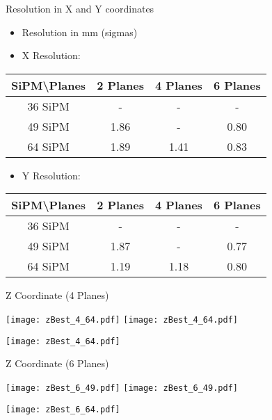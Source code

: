 \documentclass{beamer}
\begin{document}
\begin{frame}{Resolution in X and Y coordinates}
\begin{center}
\begin{itemize}
\item Resolution in mm (sigmas)
\item X Resolution:
\vspace{0.5 cm}
\end{itemize}
 \begin{tabular}{c|ccc|}
  \toprule
  SiPM\textbackslash Planes & \textbf{2 Planes} & \textbf{4 Planes} & \textbf{6 Planes} \\
   \hline
  36 SiPM & - & - & -  \\
  49 SiPM & 1.86 & - & 0.80\\
  64 SiPM & 1.89 & 1.41 & 0.83 \\    \toprule
 \end{tabular}
\begin{itemize}
\item Y Resolution:
\vspace{0.5 cm}
\end{itemize}
 \begin{tabular}{c|ccc|}
  \toprule
  SiPM\textbackslash Planes & \textbf{2 Planes} & \textbf{4 Planes} & \textbf{6 Planes} \\
   \hline
  36 SiPM & - & - & -  \\
  49 SiPM & 1.87 & - & 0.77\\
  64 SiPM & 1.19 & 1.18 & 0.80 \\    \toprule
 \end{tabular}
\end{center}
\end{frame}

\begin{frame}{Z Coordinate (4 Planes)}
\begin{adjustwidth}{-1.5em}{-1.5em}
	\texttt{[image: zBest\_4\_64.pdf]}
	\texttt{[image: zBest\_4\_64.pdf]} \\
	\begin{center} {\texttt{[image: zBest\_4\_64.pdf]}} \end{center}
\end{adjustwidth}
\end{frame}

\begin{frame}{Z Coordinate (6 Planes)}
\begin{adjustwidth}{-1.5em}{-1.5em}
	\texttt{[image: zBest\_6\_49.pdf]}
	\texttt{[image: zBest\_6\_49.pdf]} \\
	\begin{center} {\texttt{[image: zBest\_6\_64.pdf]}} \end{center}
\end{adjustwidth}
\end{frame}
\end{document}
